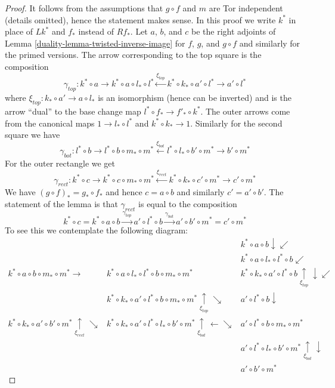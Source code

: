 \begin{proof}

It follows from the assumptions that $g \circ f$ and $m$ are Tor
independent (details omitted), hence the statement makes sense.
In this proof we write $k^*$ in place of $Lk^*$ and $f_*$ instead
of $Rf_*$. Let $a$, $b$, and $c$ be the right adjoints of
Lemma \ref{duality-lemma-twisted-inverse-image}
for $f$, $g$, and $g \circ f$ and similarly for the primed versions.
The arrow corresponding to the top square is the composition
$$
\gamma_{top} :
k^* \circ a \to k^* \circ a \circ l_* \circ l^*
\xleftarrow{\xi_{top}} k^* \circ k_* \circ a' \circ l^* \to a' \circ l^*
$$
where $\xi_{top} : k_* \circ a' \to a \circ l_*$
is an isomorphism (hence can be inverted)
and is the arrow ``dual'' to the base change map
$l^* \circ f_* \to f'_* \circ k^*$. The outer arrows come
from the canonical maps $1 \to l_* \circ l^*$ and $k^* \circ k_* \to 1$.
Similarly for the second square we have
$$
\gamma_{bot} :
l^* \circ b \to l^* \circ b \circ m_* \circ m^*
\xleftarrow{\xi_{bot}} l^* \circ l_* \circ b' \circ m^* \to b' \circ m^*
$$
For the outer rectangle we get
$$
\gamma_{rect} :
k^* \circ c \to k^* \circ c \circ m_* \circ m^*
\xleftarrow{\xi_{rect}} k^* \circ k_* \circ c' \circ m^* \to c' \circ m^*
$$
We have $(g \circ f)_* = g_* \circ f_*$ and hence
$c = a \circ b$ and similarly $c' = a' \circ b'$.
The statement of the lemma is that $\gamma_{rect}$
is equal to the composition
$$
k^* \circ c = k^* \circ a \circ b \xrightarrow{\gamma_{top}}
a' \circ l^* \circ b \xrightarrow{\gamma_{bot}}
a' \circ b' \circ m^* = c' \circ m^*
$$
To see this we contemplate the following diagram:
$$
\begin{array}{ccc} &  & k^* \circ a \circ b \downarrow\swarrow \\  &  & k^* \circ a \circ l_* \circ l^* \circ b \swarrow \\ k^* \circ a \circ b \circ m_* \circ m^* \longrightarrow & k^* \circ a \circ l_* \circ l^* \circ b \circ m_* \circ m^* & k^* \circ k_* \circ a' \circ l^* \circ b \underset{\xi_{top}}{\uparrow}\downarrow\swarrow \\  & k^*\circ k_* \circ a' \circ l^* \circ b \circ m_* \circ m^*
\underset{\xi_{top}}{\uparrow}\searrow & a' \circ l^* \circ b \downarrow \\ k^* \circ k_* \circ a' \circ b' \circ m^* \underset{\xi_{rect}}{\uparrow}\searrow & k^*\circ k_* \circ a' \circ l^* \circ l_* \circ b' \circ m^*
\underset{\xi_{bot}}{\uparrow}\longleftarrow\searrow & a' \circ l^* \circ b \circ m_* \circ m^* \\  &  & a' \circ l^* \circ l_* \circ b' \circ m^* \underset{\xi_{bot}}{\uparrow}\downarrow \\  &  & a' \circ b' \circ m^*\end{array}
$$
\end{proof}

